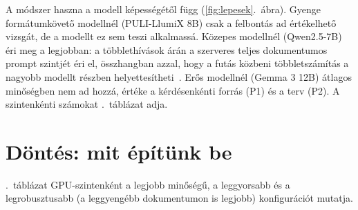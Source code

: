 A módszer haszna a modell képességétől függ (\ref{fig:lepesek}.~ábra). Gyenge formátumkövető modellnél
(PULI-LlumiX 8B) csak a felbontás ad értékelhető vizsgát, de a modellt ez sem teszi alkalmassá. Közepes
modellnél (Qwen2.5-7B) éri meg a legjobban: a többlethívások árán a szerveres teljes dokumentumos prompt
szintjét éri el, összhangban azzal, hogy a futás közbeni többletszámítás a nagyobb modellt részben
helyettesítheti~\cite{snell2025scaling}. Erős modellnél (Gemma 3 12B) átlagos minőségben nem ad hozzá, értéke
a kérdésenkénti forrás (P1) és a terv (P2). A szintenkénti számokat \az{\ref{tab:dontes}}.~táblázat adja.

\section{Döntés: mit építünk be}
\label{sec:dontes}

\Az{\ref{tab:dontes}}.~táblázat GPU-szintenként a legjobb minőségű, a leggyorsabb és a legrobusztusabb
(a leggyengébb dokumentumon is legjobb) konfigurációt mutatja.

